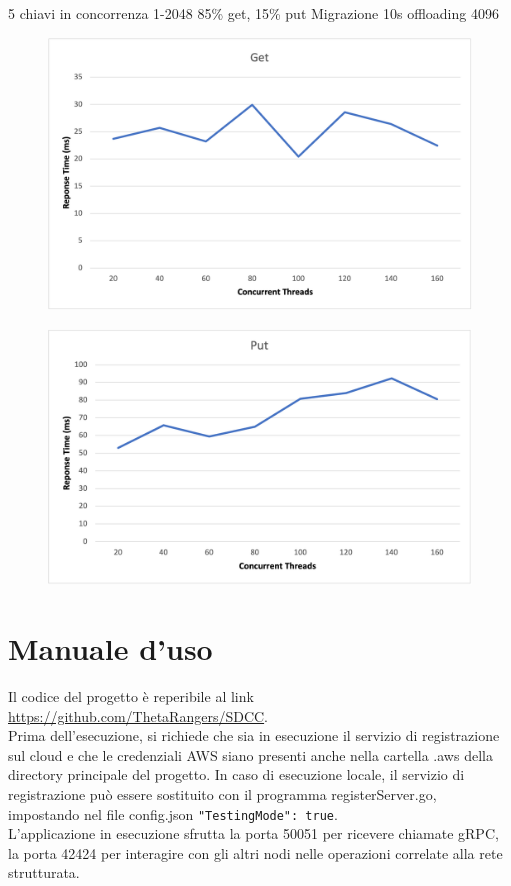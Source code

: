 \documentclass[conference]{IEEEtran}
\begin{document}
5 chiavi in concorrenza 1-2048
85\% get, 15\% put Migrazione 10s offloading 4096
\begin{figure}[h]
  \includegraphics[scale=0.5]{images/get.png}
\end{figure}
\begin{figure}[h]
  \includegraphics[scale=0.5]{images/put.png}
\end{figure}

\section{Manuale d'uso}
Il codice del progetto è reperibile al link \href{https://github.com/ThetaRangers/SDCC}{https://github.com/ThetaRangers/SDCC}.\\
Prima dell'esecuzione, si richiede che sia in esecuzione il servizio di registrazione sul cloud e che le credenziali
AWS siano presenti anche nella cartella .aws della directory principale del progetto. In caso di esecuzione locale, il servizio
di registrazione può essere sostituito con il programma registerServer.go, impostando nel file config.json \verb!"TestingMode": true!.\\
L'applicazione in esecuzione sfrutta la porta 50051 per ricevere
chiamate gRPC, la porta 42424 per interagire con gli altri nodi nelle operazioni correlate alla rete strutturata.
\end{document}
